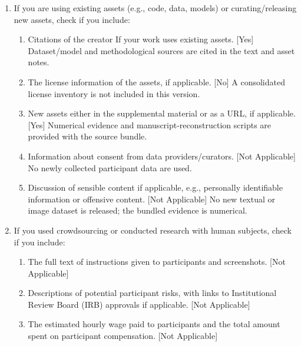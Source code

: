 {\begin{enumerate}
\begin{enumerate}
\item All the training details (e.g., data splits, hyperparameters, how they were chosen). [Yes] Experiment-specific descriptions and calibration splits are in the appendices and accompanying protocols.
\item A clear definition of the specific measure or statistics and error bars (e.g., with respect to the random seed after running experiments multiple times). [Yes] All figures show individual records or seeds; ratios, medians, counts and the VAE bootstrap are defined explicitly.
\item A description of the computing infrastructure used. (e.g., type of GPUs, internal cluster, or cloud provider). [No] CPU/thread settings are specified for the main timing comparisons, but a complete hardware inventory for every legacy run is not available in this manuscript.
\end{enumerate}
\item If you are using existing assets (e.g., code, data, models) or curating/releasing new assets, check if you include:
\begin{enumerate}
\item Citations of the creator If your work uses existing assets. [Yes] Dataset/model and methodological sources are cited in the text and asset notes.
\item The license information of the assets, if applicable. [No] A consolidated license inventory is not included in this version.
\item New assets either in the supplemental material or as a URL, if applicable. [Yes] Numerical evidence and manuscript-reconstruction scripts are provided with the source bundle.
\item Information about consent from data providers/curators. [Not Applicable] No newly collected participant data are used.
\item Discussion of sensible content if applicable, e.g., personally identifiable information or offensive content. [Not Applicable] No new textual or image dataset is released; the bundled evidence is numerical.
\end{enumerate}
\item If you used crowdsourcing or conducted research with human subjects, check if you include:
\begin{enumerate}
\item The full text of instructions given to participants and screenshots. [Not Applicable]
\item Descriptions of potential participant risks, with links to Institutional Review Board (IRB) approvals if applicable. [Not Applicable]
\item The estimated hourly wage paid to participants and the total amount spent on participant compensation. [Not Applicable]
\end{enumerate}
\end{enumerate}
}
